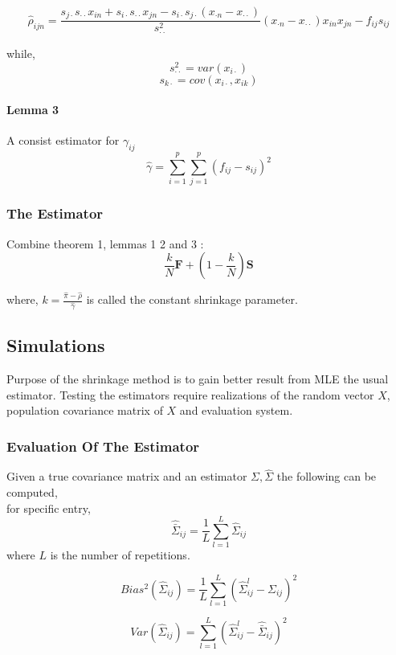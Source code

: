 \documentclass[letterpaper]{article}
\begin{document}
	\[\hat{\rho}_{ijn} = \frac{s_{j\cdot}s_{\cdot \cdot}x_{in} + s_{i\cdot}s_{\cdot\cdot}x_{jn} - s_{i\cdot} s_{j\cdot}   \left(x_{\cdot n}-x_{\cdot\cdot}\right) }{s_{\cdot\cdot}^{2} } \left(x_{\cdot n}-x_{\cdot\cdot}\right)x_{in}x_{jn} - f_{ij}s_{ij}\]
	
	while,
	\[s_{\cdot\cdot}^{2} = var(x_{i\cdot}) \]
	\[s_{k\cdot} = cov(x_{i\cdot}, x_{ik}) \]
	
	
	\paragraph{Lemma 3} A consist estimator for \(\gamma_{ij} \)
	\[\hat{\gamma} =  \sum_{i=1}^{p} \sum_{j=1}^{p} \left( f_{ij} - s_{ij}\right)^{2} \]
	
	\subsubsection{The Estimator}
	Combine theorem 1, lemmas 1 2 and 3 : 
	\[
	\frac{k}{N}\boldsymbol{F} +
	\left(1- \frac{k}{N}  \right)
	\boldsymbol{S}
	\]
	
	where, \(k = \frac{\hat{\pi} - \hat{\rho} }{ \hat{\gamma} }\) is called the constant shrinkage parameter.
	
	\subsection{Simulations}
	Purpose of the shrinkage method is to gain better result from MLE the usual estimator. Testing the estimators require realizations of the random vector \(X\),  population covariance matrix of \(X\) and evaluation system.   
	
	\subsubsection{Evaluation Of The Estimator}
	Given a true covariance matrix and an estimator \(\Sigma , \hat{\Sigma}\) the following can be computed,\\
	
	for specific entry,
	\[\hat{\bar{\Sigma}}_{ij} = \frac{1}{L}\sum_{l=1}^{L}\hat{\Sigma}_{ij} \]
	where \(L\) is the number of repetitions.
	
	\[ Bias^2( \hat{\Sigma}_{ij} ) = \frac{1}{L}\sum_{l=1}^{L} \left( \hat{{\Sigma}}_{ij}^{l} - \Sigma_{ij}
	\right)^{2} \]
	
	\[Var(\hat{\Sigma}_{ij}) = \sum_{l=1}^{L} 
	\left(
	 \hat{\Sigma}_{ij}^{l} -\hat{\bar{\Sigma}}_{ij} 
	 \right)^{2}
	  \]
\end{document}
